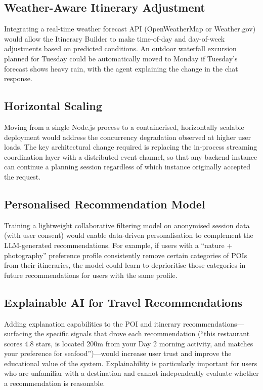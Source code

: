 \documentclass[12pt,a4paper]{report}
\begin{document}
\subsection{Weather-Aware Itinerary Adjustment}

Integrating a real-time weather forecast API (OpenWeatherMap or Weather.gov) would allow the Itinerary Builder to make time-of-day and day-of-week adjustments based on predicted conditions. An outdoor waterfall excursion planned for Tuesday could be automatically moved to Monday if Tuesday's forecast shows heavy rain, with the agent explaining the change in the chat response.

\subsection{Horizontal Scaling}

Moving from a single Node.js process to a containerised, horizontally scalable deployment would address the concurrency degradation observed at higher user loads. The key architectural change required is replacing the in-process streaming coordination layer with a distributed event channel, so that any backend instance can continue a planning session regardless of which instance originally accepted the request.

\subsection{Personalised Recommendation Model}

Training a lightweight collaborative filtering model on anonymised session data (with user consent) would enable data-driven personalisation to complement the LLM-generated recommendations. For example, if users with a ``nature + photography'' preference profile consistently remove certain categories of POIs from their itineraries, the model could learn to deprioritise those categories in future recommendations for users with the same profile.

\subsection{Explainable AI for Travel Recommendations}

Adding explanation capabilities to the POI and itinerary recommendations---surfacing the specific signals that drove each recommendation (``this restaurant scores 4.8 stars, is located 200m from your Day 2 morning activity, and matches your preference for seafood'')---would increase user trust and improve the educational value of the system. Explainability is particularly important for users who are unfamiliar with a destination and cannot independently evaluate whether a recommendation is reasonable.
\end{document}

